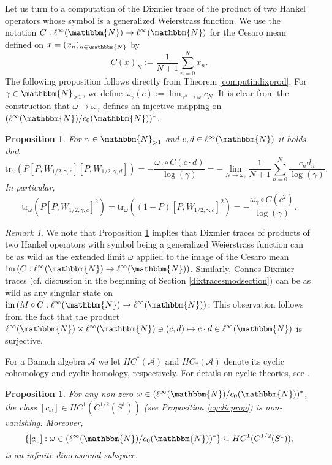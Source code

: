 \documentclass[10pt]{amsart}
\newtheorem{prop}[thm]{Proposition}
\theoremstyle{remark}
\newtheorem{remark}[thm]{Remark}
\theoremstyle{definition}
\begin{document}
Let us turn to a computation of the Dixmier trace of the product of two Hankel operators whose symbol is a generalized Weierstrass function. We use the notation $C:\ell^\infty({\mathbbm{N}})\to \ell^\infty({\mathbbm{N}})$ for the Cesaro mean defined on $x=(x_n)_{n\in {\mathbbm{N}}}$ by
$$C(x)_N:=\frac{1}{N+1}\sum_{n=0}^{N} x_n.$$
The following proposition follows directly from Theorem \ref{computindixprod}. For $\gamma\in {\mathbbm{N}}_{>1}$, we define $\omega_\gamma(c):=\lim_{\gamma^N\to \omega} c_N$. It is clear from the construction that $\omega\mapsto \omega_\gamma$ defines an injective mapping on $(\ell^\infty({\mathbbm{N}})/c_0({\mathbbm{N}}))^*$.

\begin{prop}
\label{hankcomp}
For $\gamma\in {\mathbbm{N}}_{>1}$ and $c,d\in \ell^\infty({\mathbbm{N}})$ it holds that
$${\mathrm{t}\mathrm{r}}_\omega(P[P,W_{1/2,\gamma,c}][P,W_{1/2,\gamma,d}])=-\frac{\omega_\gamma\circ C(c\cdot d)}{\log(\gamma)}=-\lim_{N\to \omega_\gamma}\frac{1}{N+1}\sum_{n=0}^{N} \frac{c_nd_n}{\log(\gamma)}.$$
In particular,
$${\mathrm{t}\mathrm{r}}_\omega(P[P,W_{1/2,\gamma,c}]^2)={\mathrm{t}\mathrm{r}}_\omega((1-P)[P,W_{1/2,\gamma,c}]^2)=-\frac{\omega_\gamma\circ C(c^2)}{\log(\gamma)}.$$
\end{prop}

\begin{remark}
We note that Proposition \ref{hankcomp} implies that Dixmier traces of products of two Hankel operators with symbol being a generalized Weierstrass function can be as wild as the extended limit $\omega$ applied to the image of the Cesaro mean ${\mathrm{i} \mathrm{m} \,}(C:\ell^\infty({\mathbbm{N}})\to \ell^\infty({\mathbbm{N}}))$. Similarly, Connes-Dixmier traces (cf. discussion in the beginning of Section \ref{dixtracesmodsection}) can be as wild as any singular state on ${\mathrm{i} \mathrm{m} \,}(M\circ C:\ell^\infty({\mathbbm{N}})\to \ell^\infty({\mathbbm{N}}))$. This observation follows from the fact that the product $\ell^\infty({\mathbbm{N}})\times \ell^\infty({\mathbbm{N}})\ni (c,d)\mapsto c\cdot d\in \ell^\infty({\mathbbm{N}})$ is surjective.
\end{remark}

For a Banach algebra $\mathcal{A}$ we let $HC^*(\mathcal{A})$ and $HC_*(\mathcal{A})$ denote its cyclic cohomology and cyclic homology, respectively. For details on cyclic theories, see \cite[Chapter III]{c}.

\begin{prop}
\label{classcomputationcyc}
For any non-zero $\omega\in (\ell^\infty({\mathbbm{N}})/c_0({\mathbbm{N}}))^*$, the class $[c_\omega]\in HC^1(C^{1/2}(S^1))$ (see Proposition \ref{cyclicprop}) is non-vanishing. Moreover, 
\begin{equation}
\label{spaceofcocy}
\{[c_\omega]:\omega\in (\ell^\infty({\mathbbm{N}})/c_0({\mathbbm{N}}))^*\}\subseteq HC^1(C^{1/2}(S^1)),
\end{equation}
is an infinite-dimensional subspace.
\end{prop}
\end{document}
